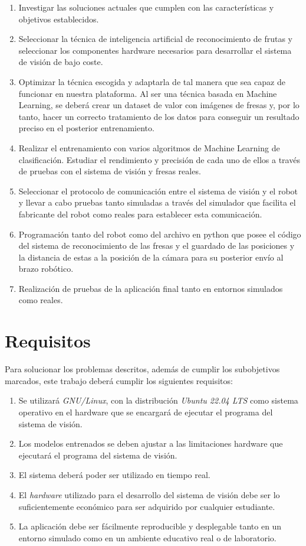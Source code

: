 \begin{enumerate}
  \item Investigar las soluciones actuales que cumplen con las características y objetivos establecidos.
  \item Seleccionar la técnica de inteligencia artificial de reconocimiento de frutas y seleccionar los componentes hardware necesarios para desarrollar el sistema de visión de bajo coste.
  \item Optimizar la técnica escogida y adaptarla de tal manera que sea capaz de funcionar en nuestra plataforma. Al ser una técnica basada en Machine Learning, se deberá crear un dataset de valor con imágenes de fresas y, por lo tanto, hacer un correcto tratamiento de los datos para conseguir un resultado preciso en el posterior entrenamiento.
  \item Realizar el entrenamiento con varios algoritmos de Machine Learning de
clasificación. Estudiar el rendimiento y precisión de cada uno de ellos a través de pruebas con el sistema de visión y fresas reales.
  \item Seleccionar el protocolo de comunicación entre el sistema de visión y el robot y llevar a cabo pruebas tanto simuladas a través del simulador que facilita el fabricante del robot como reales para establecer esta comunicación.
  \item Programación tanto del robot como del archivo en python que posee el código del sistema de reconocimiento de las fresas y el guardado de las posiciones y la distancia de estas a la posición de la cámara para su posterior envío al brazo robótico.
  \item Realización de pruebas de la aplicación final tanto en entornos simulados como reales.
\end{enumerate} 


\section{Requisitos}
\label{sec:requisitos}

Para solucionar los problemas descritos, además de cumplir los subobjetivos
marcados, este trabajo deberá cumplir los siguientes requisitos:

\begin{enumerate}
  \item Se utilizará \textit{GNU/Linux}, con la distribución \textit{Ubuntu 22.04 LTS} como sistema operativo en el hardware que se encargará de ejecutar el programa del sistema de visión.
  \item Los modelos entrenados se deben ajustar a las limitaciones hardware que ejecutará el programa del sistema de visión.
  \item El sistema deberá poder ser utilizado en tiempo real. 
  \item El \textit{hardware} utilizado para el desarrollo del sistema de visión debe ser lo suficientemente económico para ser adquirido por cualquier estudiante.
  \item La aplicación debe ser fácilmente reproducible y desplegable tanto en un entorno simulado como en un ambiente educativo real o de laboratorio.
\end{enumerate}  

